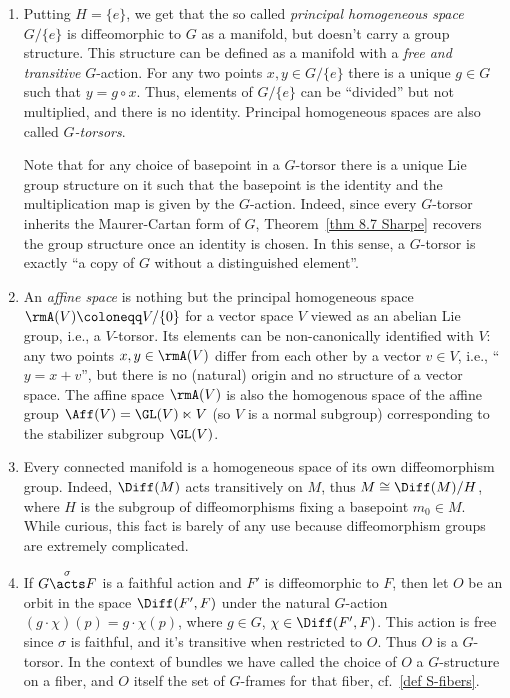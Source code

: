 \begin{example}\label{ex principal hom spaces}
    \begin{enumerate}
        \item Putting $H=\{e\}$, we get that the so called \emph{principal homogeneous space} $G\slash \{e\}$ is diffeomorphic to $G$ as a manifold, but doesn't carry a group structure. This structure can be defined as a manifold with a \emph{free and transitive} $G$-action. For any two points $x,y\in G\slash \{e\}$ there is a unique $g\in G$ such that $y=g\circ x$. Thus, elements of $G\slash\{e\}$ can be ``divided'' but not multiplied, and there is no identity. Principal homogeneous spaces are also called \emph{$G$-torsors}. 
        
        Note that for any choice of basepoint in a $G$-torsor there is a unique Lie group structure on it such that the basepoint is the identity and the multiplication map is given by the $G$-action. Indeed, since every $G$-torsor inherits the Maurer-Cartan form of $G$, Theorem~\ref{thm 8.7 Sharpe} recovers the group structure once an identity is chosen. In this sense, a $G$-torsor is exactly ``a copy of $G$ without a distinguished element''.
        
        \item An \emph{affine space} is nothing but the principal homogeneous space $\rmA(V)\coloneqq V\slash\{0\}$ for a vector space $V$ viewed as an abelian Lie group, i.e., a $V$-torsor. Its elements can be non-canonically identified with $V$: any two points $x,y\in \rmA(V)$ differ from each other by a vector $v\in V$, i.e., ``$y=x+v$'', but there is no (natural) origin and no structure of a vector space. The affine space $\rmA(V)$ is also the homogenous space of the affine group $\Aff(V)=\GL(V)\ltimes V$ (so $V$ is a normal subgroup) corresponding to the stabilizer subgroup $\GL(V)$.

        \item Every connected manifold is a homogeneous space of its own diffeomorphism group. Indeed, $\Diff(M)$ acts transitively on $M$, thus $M\cong \Diff(M)\slash H$, where $H$ is the subgroup of diffeomorphisms fixing a basepoint $m_0\in M$. While curious, this fact is barely of any use because diffeomorphism groups are extremely complicated.
        
        \item If $G\overset{\sigma}{\acts}F$ is a faithful action and $F'$ is diffeomorphic to $F$, then let $O$ be an orbit in the space $\Diff(F',F)$ under the natural $G$-action $(g\cdot \chi)(p)=g\cdot\chi(p)$, where $g\in G$, $\chi\in\Diff(F',F)$. This action is free since $\sigma$ is faithful, and it's transitive when restricted to $O$. Thus $O$ is a $G$-torsor. In the context of bundles we have called the choice of $O$ a $G$-structure on a fiber, and $O$ itself the set of $G$-frames for that fiber, cf.\ \ref{def S-fibers}.
    \end{enumerate}
\end{example}


